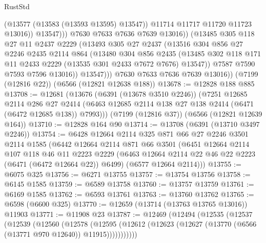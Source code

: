 \begin{lexlean}{RustStd}
\begin{coremodule}
                          (@13577 (@13583 (@13593 @13595) @13547))
                          @11714
                          @11717
                          @11720
                          @11723
                          @13016))
                      @13547)))
                @7630
                @7633
                @7636
                @7639
                @13016))
            (@13485
              @305
              @118
              @27
              @11
              @2437
              @2229
              (@13493
                @305
                @27
                @2437
                (@13516
                  @304
                  @856
                  @27
                  @2246
                  @2435
                  @2114
                  @864
                  (@13480
                    @304
                    @856
                    @2435
                    (@13485 @302 @118 @171 @11 @2433 @2229 (@13535 @301 @2433 @7672 @7676) @13547))
                  @7587
                  @7590
                  @7593
                  @7596
                  @13016))
              @13547)))
        @7630
        @7633
        @7636
        @7639
        @13016))
    (@7199 (@12816 @22))
    (@6566 (@12821 @12638 @188))
@13678 := @12828 @188 @885
@13708 := @12681
    (@13676
      (@6391 (@13678 @3510 @2246))
      (@7251
        @12685
        @2114
        @286
        @27
        @2414
        (@6463 @12685 @2114 @138 @27 @138 @2414 (@6471 (@6472 @12685 @138)) @7993)))
    (@7199 (@12816 @37))
    (@6566 (@12821 @12639 @164))
@13710 := @12828 @164 @90
@13714 := @13708 (@6391 (@13710 @3497 @2246))
@13754 := @6428
    @12664
    @2114
    @325
    @871
    @66
    @27
    @2246
    @3501
    @2114
    @1585
    (@6442
      @12664
      @2114
      @871
      @66
      @3501
      (@6451
        @12664
        @2114
        @107
        @118
        @46
        @11
        @2223
        @2229
        (@6463 @12664 @2114 @22 @46 @22 @2223 (@6471 (@6472 @12664 @22)) @6499)
        (@6577 @12664 @2114)))
@13755 := @6075 @325
@13756 := @6271 @13755
@13757 := @13754 @13756
@13758 := @6145 @1585
@13759 := @6589 @13758
@13760 := @13757 @13759
@13761 := @6169 @1585
@13762 := @6593 @13761
@13763 := @13760 @13762
@13765 := @6598 (@6600 @325)
@13770 := @12659 (@13714 (@13763 @13765 @13016)) @11903
@13771 := @11908 @23
@13787 := @12469
    (@12494
      (@12535
        (@12537
          (@12539
            (@12560
              (@12578
                (@12595
                  (@12612 (@12623 (@12627 (@13770 (@6566 (@13771 @970 @12640)) @11915)))))))))))

\end{coremodule}
\end{lexlean}
